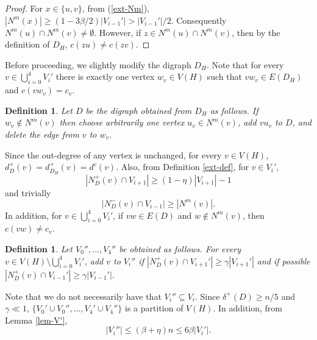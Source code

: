 \documentclass{article}
\newtheorem{defn}[theorem]{Definition}
\begin{document}
 \begin{proof}
 For $x\in \{u,v\}$, from (\ref{ext-Nm}),
 $|N^m(x)|\geq (1-3\beta/2)|V_{i-1}'| >|V_{i-1}'|/2.$ Consequently $N^m(u)\cap N^m(v)\neq \emptyset$. However, if $z\in N^m(u)\cap N^m(v)$, then by the definition of $D_H$, $c(zu)\neq c(zv)$.
 \end{proof}
{Before proceeding, we slightly modify  the digraph $D_H$. Note that for every $v\in \bigcup_{i=0}^4 V_i'$ there is exactly one vertex $w_v\in V(H)$ such that $vw_v\in E(D_H)$ and   $c(vw_v)=c_v$.

\begin{defn}\label{def-ext-D}Let $D$ be the digraph obtained from $D_H$ as follows.  If $w_v\notin N^m(v)$ then choose arbitrarily one vertex $u_v\in N^m(v)$, add $vu_v$ to $D$, and delete the edge  from $v$ to $w_v$.\end{defn}
Since the out-degree of any vertex is unchanged, for every $v\in V(H)$, $d_D^+(v)= d_{D_H}^+(v)= d^c(v)$. Also, from Definition \ref{ext-def}, for $v\in  V_i'$, 
\begin{equation}\label{eq-new}|N^+_D(v)\cap V_{i+1}|\geq (1-\eta)|V_{i+1}|-1\end{equation}
and trivially
$$|N^-_D(v)\cap V_{i-1}|\geq |N^m(v)|.$$
In addition, for $v\in \bigcup_{i=0}^4 V_i'$, if $vw\in E(D)$ and $w\notin N^m(v)$, then $c(vw)\neq c_v$.}


 \begin{defn}\label{ext-def-V''}
 Let $V_0'', \dots, V_4''$ be obtained as follows. For every $v\in V(H)\setminus \bigcup_{i=0}^4 V_i'$, add $v$ to $V_i''$ if $|N_D^+(v)\cap V_{i+1}'|\geq \gamma|V_{i+1}'|$  and if possible $|N_D^+(v)\cap V_{i-1}'|\geq \gamma |V_{i-1}'|$. 
 \end{defn}
Note that we do not necessarily have that $V_i'' \subseteq V_i$.  Since $\delta^+(D)\geq n/5$ and $\gamma \ll 1$, $\{V_0'\cup V_0'', \dots, V_4'\cup V_4''\}$ is a partition of $V(H).$ In addition, from Lemma \ref{lem-V'},
 \begin{equation}\label{eq-V_i''}
     |V_i''|\leq (\beta+\eta) n\leq 6\beta |V_i'|.
 \end{equation}
\end{document}
